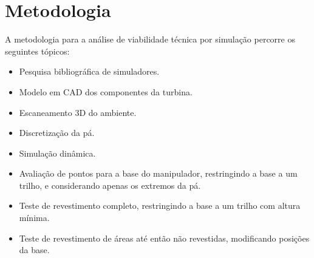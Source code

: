 \section{Metodologia}\label{metodologia}

A metodologia para a análise de viabilidade técnica por simulação percorre os
seguintes tópicos:

\begin{itemize}
  \item Pesquisa bibliográfica de simuladores.
  \item Modelo em CAD dos componentes da turbina.
  \item Escaneamento 3D do ambiente.  
  \item Discretização da pá.
  \item Simulação dinâmica.
  \item Avaliação de pontos para a base do manipulador, restringindo a base a um
  trilho, e considerando apenas os extremos da pá.
  \item Teste de revestimento completo, restringindo a base a um trilho com
  altura mínima.
  \item Teste de revestimento de áreas até então não revestidas,
  modificando posições da base.
\end{itemize}
